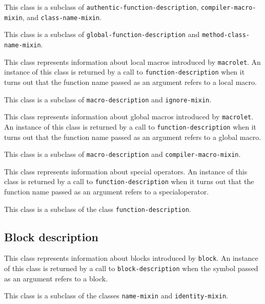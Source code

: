 This class is a subclass of \texttt{authentic-function-description},
\texttt{compiler-macro-mixin}, and \texttt{class-name-mixin}.

{\footnotesize
{}
}

This class is a subclass of \texttt{global-function-description} and
\texttt{method-class-name-mixin}.


{\footnotesize
{}
}

This class represents information about local macros introduced by
\texttt{macrolet}.  An instance of this class is returned by a call to
\texttt{function-description} when it turns out that the function name passed
as an argument refers to a local macro.

This class is a subclass of \texttt{macro-description} and \texttt{ignore-mixin}.

{\footnotesize
{}
}

This class represents information about global macros introduced by
\texttt{macrolet}.  An instance of this class is returned by a call to
\texttt{function-description} when it turns out that the function name passed
as an argument refers to a global macro.

This class is a subclass of \texttt{macro-description} and
\texttt{compiler-macro-mixin}.

{\footnotesize
{}
}

This class represents information about special operators.  An
instance of this class is returned by a call to \texttt{function-description}
when it turns out that the function name passed as an argument refers
to a specialoperator.

This class is a subclass of the class \texttt{function-description}.

\subsection{Block description}
\label{sec-instantiable-classes-block-desciption}

{\footnotesize
{}
}

This class represents information about blocks introduced by
\texttt{block}.  An instance of this class is returned by a call to
\texttt{block-description} when the symbol passed as an argument refers to a
block.

This class is a subclass of the classes \texttt{name-mixin} and
\texttt{identity-mixin}.

